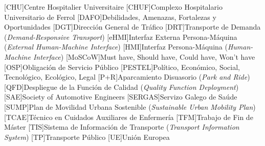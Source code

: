 \begin{acronym}[PESTEL]
  [CHU]{Centre Hospitalier Universitaire}
  [CHUF]{Complexo Hospitalario Universitario de Ferrol}
  [DAFO]{Debilidades, Amenazas, Fortalezas y Oportunidades}
  [DGT]{Dirección General de Tráfico}
  [DRT]{Transporte de Demanda (\emph{Demand-Responsive Transport})}
  [eHMI]{Interfaz Externa Persona-Máquina (\emph{External Human-Machine Interface})}
  [HMI]{Interfaz Persona-Máquina (\emph{Human-Machine Interface})}
  [MoSCoW]{Must have, Should have, Could have, Won't have}
  [OSP]{Obligación de Servicio Público}
  [PESTEL]{Político, Económico, Social, Tecnológico, Ecológico, Legal}
  [P+R]{Aparcamiento Disuasorio (\emph{Park and Ride})}
  [QFD]{Despliegue de la Función de Calidad (\emph{Quality Function Deployment})}
  [SAE]{Society of Automotive Engineers}
  [SERGAS]{Servizo Galego de Saúde}
  [SUMP]{Plan de Movilidad Urbana Sostenible (\emph{Sustainable Urban Mobility Plan})}
  [TCAE]{Técnico en Cuidados Auxiliares de Enfermería}
  [TFM]{Trabajo de Fin de Máster}
  [TIS]{Sistema de Información de Transporte (\emph{Transport Information System})}
  [TP]{Transporte Público}
  [UE]{Unión Europea}
\end{acronym}
